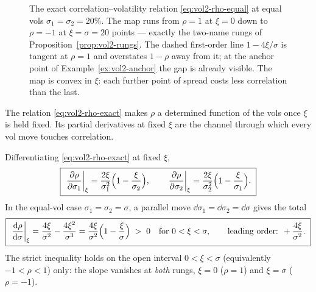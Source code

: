 \begin{figure}[htbp]
\centering
{}
\caption{The exact correlation--volatility relation
\eqref{eq:vol2-rho-equal} at equal vols $\sigma_1 = \sigma_2 = 20\%$. The
map runs from $\rho = 1$ at $\xi = 0$ down to $\rho = -1$ at
$\xi = \sigma = 20$ points --- exactly the two-name rungs of
Proposition~\ref{prop:vol2-rungs}. The dashed first-order line
$1 - 4\xi/\sigma$ is tangent at $\rho = 1$ and overstates $1-\rho$ away
from it; at the anchor point of Example~\ref{ex:vol2-anchor} the gap is
already visible. The map is convex in $\xi$: each further point of spread
costs less correlation than the last.}
\label{fig:vol2-rho-of-xi}
\end{figure}

The relation \eqref{eq:vol2-rho-exact} makes $\rho$ a determined function of
the vols once $\xi$ is held fixed. Its partial derivatives at fixed $\xi$
are the channel through which every vol move touches correlation.

\begin{proposition}
\label{prop:vol2-rho-partials}
Differentiating \eqref{eq:vol2-rho-exact} at fixed $\xi$,
\begin{equation}
\boxed{\;
\left.\frac{\partial \rho}{\partial \sigma_1}\right|_{\xi}
 = \frac{2\xi}{\sigma_1^2}\Bigl(1 - \frac{\xi}{\sigma_2}\Bigr),
\qquad
\left.\frac{\partial \rho}{\partial \sigma_2}\right|_{\xi}
 = \frac{2\xi}{\sigma_2^2}\Bigl(1 - \frac{\xi}{\sigma_1}\Bigr).
\;}
\label{eq:vol2-rho-partials}
\end{equation}
In the equal-vol case $\sigma_1 = \sigma_2 = \sigma$, a parallel move
$\dd\sigma_1 = \dd\sigma_2 = \dd\sigma$ gives the total
\begin{equation}
\boxed{\;
\left.\frac{\mathrm{d} \rho}{\mathrm{d} \sigma}\right|_{\xi}
 = \frac{4\xi}{\sigma^2} - \frac{4\xi^2}{\sigma^3}
 = \frac{4\xi}{\sigma^2}\Bigl(1 - \frac{\xi}{\sigma}\Bigr) \;>\; 0
\quad\text{for } 0 < \xi < \sigma,
\qquad\text{leading order: } +\frac{4\xi}{\sigma^2}.
\;}
\label{eq:vol2-drho-dsigma}
\end{equation}
The strict inequality holds on the open interval $0 < \xi < \sigma$
(equivalently $-1 < \rho < 1$) only: the slope vanishes at \emph{both}
rungs, $\xi = 0$ ($\rho = 1$) and $\xi = \sigma$ ($\rho = -1$).
\end{proposition}

